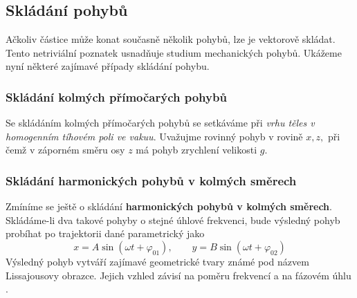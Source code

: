     \subsection{Skládání pohybů}
      Ačkoliv částice může konat současně několik pohybů, lze je vektorově skládat. Tento 
      netriviální poznatek usnadňuje studium mechanických pohybů. Ukážeme nyní některé zajímavé 
      případy skládání pohybu.
  
    \subsubsection{Skládání kolmých přímočarých pohybů}
      Se skládáním kolmých přímočarých pohybů se setkáváme při \emph{vrhu těles v homogenním 
      tíhovém poli ve vakuu}. Uvažujme rovinný pohyb v rovině $x, z,$ při čemž v záporném směru osy 
      $z$ má pohyb zrychlení velikosti $g$.

    \subsubsection{Skládání harmonických pohybů v kolmých směrech}
      Zmíníme se ještě o skládání \textbf{harmonických pohybů v kolmých smě\-rech}. Sklá\-dá\-me-li 
      dva takové pohyby o stejné úhlové frekvenci, bude výsledný pohyb probíhat po trajektorii dané 
      parametrický jako
      \begin{equation}\label{mech:eq_lissaujous1}
          x=A\sin(\omega t+\varphi_{01}),\qquad y=B\sin(\omega t +\varphi_{02})
      \end{equation}
      Výsledný pohyb vytváří zajímavé geometrické tvary známé pod názvem Lissajousovy obrazce. 
      Jejich vzhled závisí na poměru frekvencí a na fázovém úhlu \cite{Okrouhlik}.

